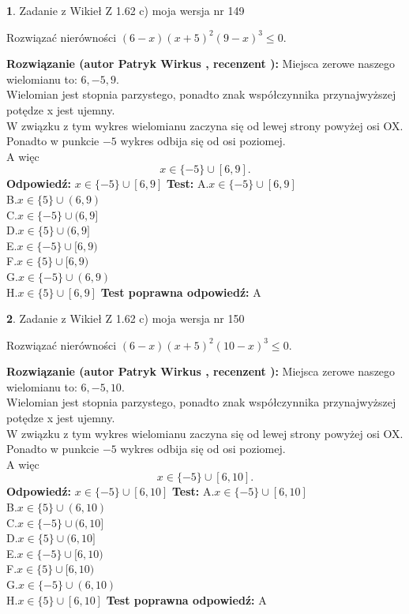 \documentclass[12pt, a4paper]{article}
\theoremstyle{definition} %
\newtheorem{zad}{}
\newcommand{\zadStart}[1]{\begin{zad}#1\newline}
\newcommand{\zadStop}{\end{zad}}
\newcommand{\rozwStart}[2]{\noindent \textbf{Rozwiązanie (autor #1 , recenzent #2): }\newline}
\newcommand{\rozwStop}{\newline}
\newcommand{\odpStart}{\noindent \textbf{Odpowiedź:}\newline}
\newcommand{\odpStop}{\newline}
\newcommand{\testStart}{\noindent \textbf{Test:}\newline}
\newcommand{\testStop}{\newline}
\newcommand{\kluczStart}{\noindent \textbf{Test poprawna odpowiedź:}\newline}
\newcommand{\kluczStop}{\newline}
\begin{document}
\zadStart{Zadanie z Wikieł Z 1.62 c) moja wersja nr 149}

Rozwiązać nierówności $(6-x)(x+5)^{2}(9-x)^{3}\le0$.
\zadStop
\rozwStart{Patryk Wirkus}{}
Miejsca zerowe naszego wielomianu to: $6, -5, 9$.\\
Wielomian jest stopnia parzystego, ponadto znak współczynnika przy\linebreak najwyższej potędze x jest ujemny.\\ W związku z tym wykres wielomianu zaczyna się od lewej strony powyżej osi OX.\\
Ponadto w punkcie $-5$ wykres odbija się od osi poziomej.\\
A więc $$x \in \{-5\} \cup [6,9].$$
\rozwStop
\odpStart
$x \in \{-5\} \cup [6,9]$
\odpStop
\testStart
A.$x \in \{-5\} \cup [6,9]$\\
B.$x \in \{5\} \cup (6,9)$\\
C.$x \in \{-5\} \cup (6,9]$\\
D.$x \in \{5\} \cup (6,9]$\\
E.$x \in \{-5\} \cup [6,9)$\\
F.$x \in \{5\} \cup [6,9)$\\
G.$x \in \{-5\} \cup (6,9)$\\
H.$x \in \{5\} \cup [6,9]$
\testStop
\kluczStart
A
\kluczStop



\zadStart{Zadanie z Wikieł Z 1.62 c) moja wersja nr 150}

Rozwiązać nierówności $(6-x)(x+5)^{2}(10-x)^{3}\le0$.
\zadStop
\rozwStart{Patryk Wirkus}{}
Miejsca zerowe naszego wielomianu to: $6, -5, 10$.\\
Wielomian jest stopnia parzystego, ponadto znak współczynnika przy\linebreak najwyższej potędze x jest ujemny.\\ W związku z tym wykres wielomianu zaczyna się od lewej strony powyżej osi OX.\\
Ponadto w punkcie $-5$ wykres odbija się od osi poziomej.\\
A więc $$x \in \{-5\} \cup [6,10].$$
\rozwStop
\odpStart
$x \in \{-5\} \cup [6,10]$
\odpStop
\testStart
A.$x \in \{-5\} \cup [6,10]$\\
B.$x \in \{5\} \cup (6,10)$\\
C.$x \in \{-5\} \cup (6,10]$\\
D.$x \in \{5\} \cup (6,10]$\\
E.$x \in \{-5\} \cup [6,10)$\\
F.$x \in \{5\} \cup [6,10)$\\
G.$x \in \{-5\} \cup (6,10)$\\
H.$x \in \{5\} \cup [6,10]$
\testStop
\kluczStart
A
\kluczStop
\end{document}
